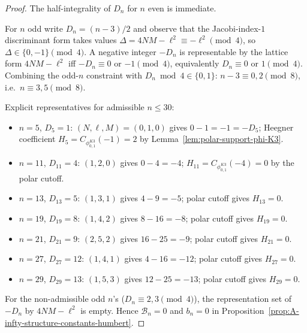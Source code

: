 \begin{proof}
The half-integrality of $D_n$ for $n$ even is immediate.

For $n$ odd write $D_n = (n-3)/2$ and observe that the Jacobi-index-$1$
discriminant form takes values $\Delta = 4NM - \ell^2 \equiv -\ell^2
\pmod 4$, so $\Delta \in \{0, -1\} \pmod 4$. A negative integer $-D_n$
is representable by the lattice form $4NM - \ell^2$ iff $-D_n \equiv 0$
or $-1 \pmod 4$, equivalently $D_n \equiv 0$ or $1 \pmod 4$. Combining
the odd-$n$ constraint with $D_n \bmod 4 \in \{0, 1\}$: $n - 3 \equiv
0, 2 \pmod 8$, i.e.\ $n \equiv 3, 5 \pmod 8$.

Explicit representatives for admissible $n \le 30$:
\begin{itemize}
\item $n = 5$, $D_5 = 1$: $(N, \ell, M) = (0, 1, 0)$ gives
 $0 - 1 = -1 = -D_5$; Heegner coefficient
 $H_5 = C_{\phi^{K3}_{0,1}}(-1) = 2$ by Lemma~\ref{lem:polar-support-phi-K3}.
\item $n = 11$, $D_{11} = 4$: $(1, 2, 0)$ gives $0 - 4 = -4$;
 $H_{11} = C_{\phi^{K3}_{0,1}}(-4) = 0$ by the polar cutoff.
\item $n = 13$, $D_{13} = 5$: $(1, 3, 1)$ gives $4 - 9 = -5$; polar
 cutoff gives $H_{13} = 0$.
\item $n = 19$, $D_{19} = 8$: $(1, 4, 2)$ gives $8 - 16 = -8$; polar
 cutoff gives $H_{19} = 0$.
\item $n = 21$, $D_{21} = 9$: $(2, 5, 2)$ gives $16 - 25 = -9$; polar
 cutoff gives $H_{21} = 0$.
\item $n = 27$, $D_{27} = 12$: $(1, 4, 1)$ gives $4 - 16 = -12$; polar
 cutoff gives $H_{27} = 0$.
\item $n = 29$, $D_{29} = 13$: $(1, 5, 3)$ gives $12 - 25 = -13$; polar
 cutoff gives $H_{29} = 0$.
\end{itemize}
For the non-admissible odd $n$'s
($D_n\equiv2,3\pmod4$), the representation set of $-D_n$ by
$4NM-\ell^2$ is empty.  Hence $\mathcal B_n=0$ and $b_n=0$ in
Proposition~\ref{prop:A-infty-structure-constants-humbert}.
\end{proof}

